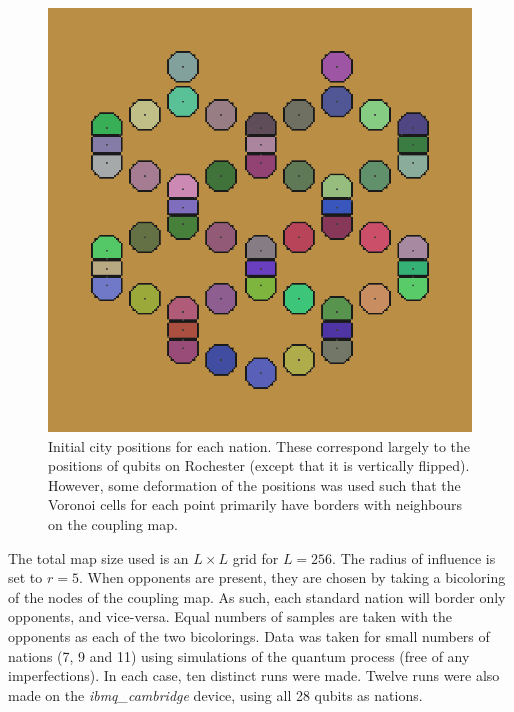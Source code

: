 \documentclass[conference]{IEEEtran}
\begin{document}
\begin{figure}[htbp]
\begin{center}
\includegraphics[width=0.95\columnwidth]{figures/initial.png}
\caption{Initial city positions for each nation. These correspond largely to the positions of qubits on Rochester (except that it is vertically flipped). However, some deformation of the positions was used such that the Voronoi cells for each point primarily have borders with neighbours on the coupling map.}
\label{initial}
\end{center}
\end{figure}


The total map size used is an $L \times L$ grid for $L=256$. The radius of influence is set to $r=5$. When opponents are present, they are chosen by taking a bicoloring of the nodes of the coupling map. As such, each standard nation will border only opponents, and vice-versa. Equal numbers of samples are taken with the opponents as each of the two bicolorings. Data was taken for small numbers of nations (7, 9 and 11) using simulations of the quantum process (free of any imperfections). In each case, ten distinct runs were made. Twelve runs were also made on the \textit{ibmq\_cambridge} device, using all 28 qubits as nations.
\end{document}
